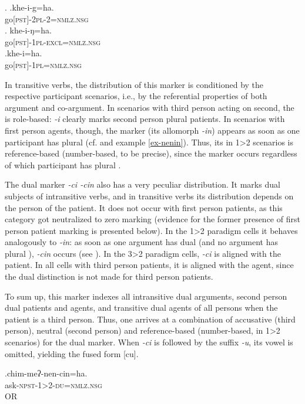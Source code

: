 	\ex. \ag.khe-i-g=ha.\\
	go{\scshape [pst]-2pl-2=nmlz.nsg}\\
	\bg. khe-i-ŋ=ha.\\
	go{\scshape [pst]-1pl-excl=nmlz.nsg}\\
	\bg.khe-i=ha.\\
	go{\scshape [pst]-1pl=nmlz.nsg}\\

In transitive verbs, the distribution of this marker is conditioned by the respective participant  scenarios, i.e., by the referential properties of both argument and co-argument. In scenarios with third person acting on second, the  is role-based: \emph{-i} clearly marks second person plural patients. In scenarios with first person agents, though, the marker (its allomorph \emph{-in}) appears as soon as one parti\-cipant has plural   (cf.  and example \ref{ex-nenin}). Thus, its  in 1>2 scenarios is reference-based (number-based, to be precise), since the marker occurs regardless of which participant has plural . 

The dual marker \emph{-ci \ti -cin} also has a very peculiar distribution. It marks dual subjects of intransitive verbs, and in transitive verbs its distribution  depends on the person of the patient. It does not occur with first person patients, as this category got neutralized to zero marking (evidence for the former presence of first person patient marking is presented below). In the 1>2 paradigm cells it behaves analogously to \emph{-in}: as soon as one argument has dual   (and no argument has plural ), \emph{-cin} occurs (see \Next). In the 3>2 paradigm cells, \emph{-ci} is aligned with the patient. In all cells with third person patients, it is aligned with the agent, since the dual distinction is not made for third person patients. 

\largerpage
To sum up, this marker indexes all intransitive dual arguments,  second person dual patients and agents, and transitive dual agents of all persons when the patient is a third person. Thus, one arrives at a combination of accusative (third person), neutral (second person) and reference-based (number-based, in 1>2 scenarios)  for the dual marker. When \emph{-ci} is followed by the suffix \emph{-u}, its vowel is omitted, yielding the fused form [cu].

\exg.chim-meʔ-nen-cin=ha.\\
ask{\scshape -npst-1>2-du=nmlz.nsg}\\
 OR\\

